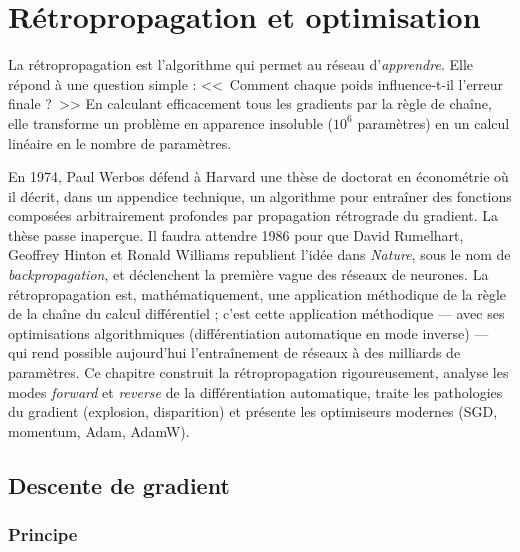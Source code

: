 \chapter{R\'etropropagation et optimisation}
\label{ch:retropropagation}

\begin{intuition}
La r\'etropropagation est l'algorithme qui permet au r\'eseau d'\emph{apprendre}. Elle r\'epond \`a une question simple : <<~Comment chaque poids influence-t-il l'erreur finale ?~>> En calculant efficacement tous les gradients par la r\`egle de cha\^ine, elle transforme un probl\`eme en apparence insoluble ($10^6$ param\`etres) en un calcul lin\'eaire en le nombre de param\`etres.
\end{intuition}

En 1974, Paul Werbos défend à Harvard une thèse de doctorat en économétrie où il décrit, dans un appendice technique, un algorithme pour entraîner des fonctions composées arbitrairement profondes par propagation rétrograde du gradient. La thèse passe inaperçue. Il faudra attendre 1986 pour que David Rumelhart, Geoffrey Hinton et Ronald Williams republient l'idée dans \emph{Nature}, sous le nom de \emph{backpropagation}, et déclenchent la première vague des réseaux de neurones. La rétropropagation est, mathématiquement, une application méthodique de la règle de la chaîne du calcul différentiel ; c'est cette application méthodique --- avec ses optimisations algorithmiques (différentiation automatique en mode inverse) --- qui rend possible aujourd'hui l'entraînement de réseaux à des milliards de paramètres. Ce chapitre construit la rétropropagation rigoureusement, analyse les modes \emph{forward} et \emph{reverse} de la différentiation automatique, traite les pathologies du gradient (explosion, disparition) et présente les optimiseurs modernes (SGD, momentum, Adam, AdamW).

\section{Descente de gradient}
\label{sec:gradient_descent}

\subsection{Principe}

